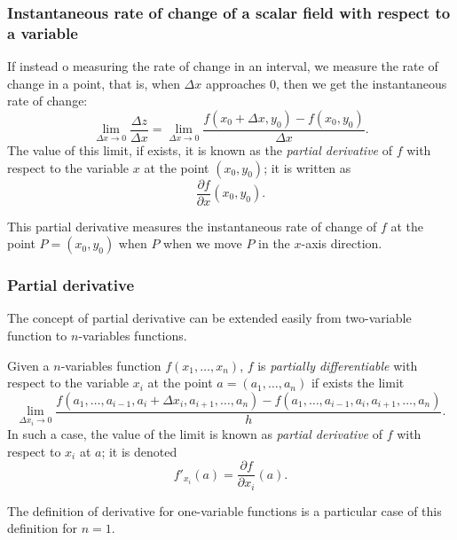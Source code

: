 \begin{frame}
\frametitle{Instantaneous rate of change of a scalar field with respect to a variable}
If instead o measuring the rate of change in an interval, we measure the rate of change in a point, that is, when $\Delta x$ approaches 0, then we get the instantaneous rate of change:
\[
\lim_{\Delta x\rightarrow 0}\frac{\Delta z}{\Delta x}=\lim_{\Delta x \rightarrow 0}\frac{f(x_0+\Delta x,y_0)-f(x_0,y_0)}{\Delta x}.
\]
The value of this limit, if exists, it is known as the \emph{partial derivative} of $f$ with respect to the variable $x$ at the point $(x_0,y_0)$; it is written as
\[
\frac{\partial f}{\partial x}(x_0,y_0).
\]

This partial derivative measures the instantaneous rate of change of $f$ at the point $P=(x_0,y_0)$ when $P$ when we move $P$ in the $x$-axis direction.
\end{frame}




\begin{frame}
\frametitle{Partial derivative}
The concept of partial derivative can be extended easily from two-variable function to $n$-variables functions.

\begin{definition}
Given a $n$-variables function $f(x_1,\ldots,x_n)$, $f$ is \emph{partially differentiable} with respect to the variable $x_i$ at the point $a=(a_1,\ldots,a_n)$ if exists the limit
\[
\lim_{\Delta x_i\rightarrow 0} \frac{f(a_1,\ldots,a_{i-1},a_i+\Delta x_i,a_{i+1},\ldots,a_n)-f(a_1,\ldots,a_{i-1},a_i,a_{i+1},\ldots,a_n)} {h}.
\]
In such a case, the value of the limit is known as \emph{partial derivative} of $f$ with respect to $x_i$ at $a$; it is denoted
\[
f'_{x_i}(a)=\frac{\partial f}{\partial x_i}(a).
\]
\end{definition}

The definition of derivative for one-variable functions is a particular case of this definition for $n=1$.
\end{frame}



